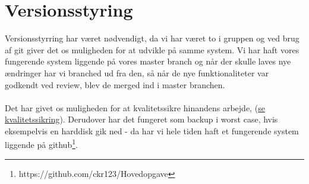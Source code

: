 \section{Versionsstyring}
Versionsstyrring har været nødvendigt, da vi har været to i gruppen og ved brug af git giver det os
muligheden for at udvikle på samme system. 
Vi har haft vores fungerende system liggende på vores master branch og når der skulle laves nye ændringer har vi branched ud fra den, så når de nye funktionaliteter var godkendt ved review, blev de merged ind i master branchen.
\\\\
Det har givet os muligheden for at kvalitetssikre hinandens arbejde, (\hyperlink{kvalitetssikring}{se kvalitetssikring}).
Derudover har det fungeret som backup i worst case, hvis eksempelvis en harddisk gik ned
- da har vi hele tiden haft et fungerende system liggende på github\footnote{https://github.com/ckr123/Hovedopgave}. 
